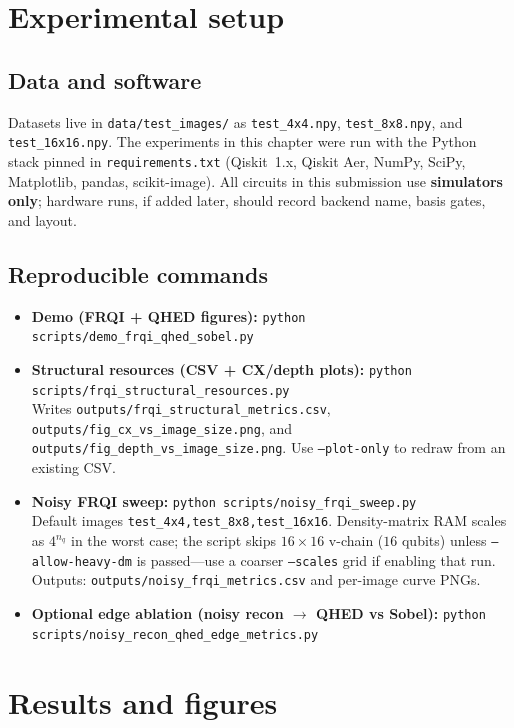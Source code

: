 \section{Experimental setup}

\subsection{Data and software}
Datasets live in \texttt{data/test\_images/} as \texttt{test\_4x4.npy}, \texttt{test\_8x8.npy}, and \texttt{test\_16x16.npy}. The experiments in this chapter were run with the Python stack pinned in \texttt{requirements.txt} (Qiskit~1.x, Qiskit Aer, NumPy, SciPy, Matplotlib, pandas, scikit-image). All circuits in this submission use \textbf{simulators only}; hardware runs, if added later, should record backend name, basis gates, and layout.

\subsection{Reproducible commands}
\begin{itemize}
  \item \textbf{Demo (FRQI + QHED figures):} \texttt{python scripts/demo\_frqi\_qhed\_sobel.py}
  \item \textbf{Structural resources (CSV + CX/depth plots):} \texttt{python scripts/frqi\_structural\_resources.py} \\
        Writes \texttt{outputs/frqi\_structural\_metrics.csv}, \texttt{outputs/fig\_cx\_vs\_image\_size.png}, and \texttt{outputs/fig\_depth\_vs\_image\_size.png}. Use \texttt{--plot-only} to redraw from an existing CSV.
  \item \textbf{Noisy FRQI sweep:} \texttt{python scripts/noisy\_frqi\_sweep.py} \\
        Default images \texttt{test\_4x4,test\_8x8,test\_16x16}. Density-matrix RAM scales as $4^{n_q}$ in the worst case; the script skips $16\times 16$ v-chain ($16$ qubits) unless \texttt{--allow-heavy-dm} is passed---use a coarser \texttt{--scales} grid if enabling that run. Outputs: \texttt{outputs/noisy\_frqi\_metrics.csv} and per-image curve PNGs.
  \item \textbf{Optional edge ablation (noisy recon $\rightarrow$ QHED vs Sobel):} \texttt{python scripts/noisy\_recon\_qhed\_edge\_metrics.py}
\end{itemize}

\section{Results and figures}

